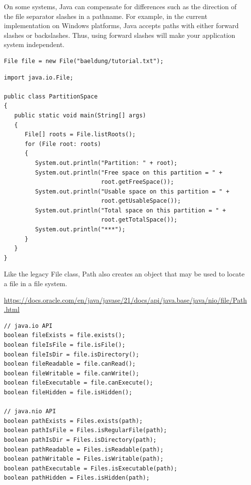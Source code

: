 On some systems,  Java can compensate for differences such as the direction of the file separator slashes in a pathname. For example,  in the current implementation on Windows platforms,  Java accepts paths with either forward slashes or backslashes.
Thus, using forward slashes will make your application system independent.

\begin{lstlisting}
File file = new File("baeldung/tutorial.txt");
\end{lstlisting}


\begin{lstlisting}
import java.io.File;

public class PartitionSpace
{
   public static void main(String[] args)
   {
      File[] roots = File.listRoots();
      for (File root: roots)
      {
         System.out.println("Partition: " + root);
         System.out.println("Free space on this partition = " +
                            root.getFreeSpace());
         System.out.println("Usable space on this partition = " +
                            root.getUsableSpace());
         System.out.println("Total space on this partition = " +
                            root.getTotalSpace());
         System.out.println("***");
      }
   }
}
\end{lstlisting}


Like the legacy File class, Path also creates an object that may be used to locate a file in a file system.


\begin{thm}
        \url{https://docs.oracle.com/en/java/javase/21/docs/api/java.base/java/nio/file/Path.html}
    \end{thm}
    





\begin{lstlisting}
// java.io API
boolean fileExists = file.exists();
boolean fileIsFile = file.isFile();
boolean fileIsDir = file.isDirectory();
boolean fileReadable = file.canRead();
boolean fileWritable = file.canWrite();
boolean fileExecutable = file.canExecute();
boolean fileHidden = file.isHidden();

// java.nio API
boolean pathExists = Files.exists(path);
boolean pathIsFile = Files.isRegularFile(path);
boolean pathIsDir = Files.isDirectory(path);
boolean pathReadable = Files.isReadable(path);
boolean pathWritable = Files.isWritable(path);
boolean pathExecutable = Files.isExecutable(path);
boolean pathHidden = Files.isHidden(path);
\end{lstlisting}



